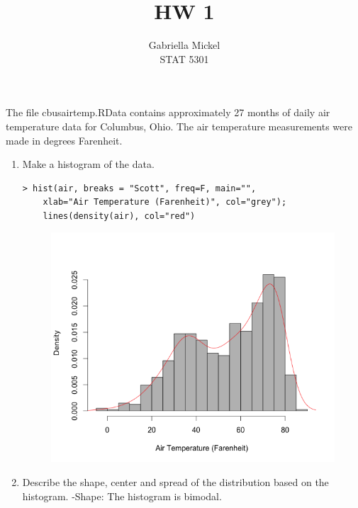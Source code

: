\documentclass[12pt]{article}
\newenvironment{question}[2][Question]{\begin{trivlist}
\item[\hskip \labelsep {\bfseries #1}\hskip \labelsep {\bfseries #2.}]}{\end{trivlist}}
\begin{document}
 
 
\title{HW 1}
\author{Gabriella Mickel\\ 
STAT 5301} 
 
\maketitle
 
\begin{question}{1}
The file cbusairtemp.RData contains approximately 27 months of daily air temperature data for Columbus, Ohio. The air temperature measurements were made in degrees Farenheit.
\end{question}
 
\begin{enumerate}[label=(\alph*)]
\item Make a histogram of the data.

\begin{lstlisting}
> hist(air, breaks = "Scott", freq=F, main="", 
	xlab="Air Temperature (Farenheit)", col="grey"); 
	lines(density(air), col="red")
\end{lstlisting}

\begin{figure}[h!]
\centering
\includegraphics[scale = .6]{Rplot.png}
\end{figure}

\item Describe the shape, center and spread of the distribution based on the histogram.
-Shape: The histogram is bimodal. 


\end{enumerate}
\end{document}
